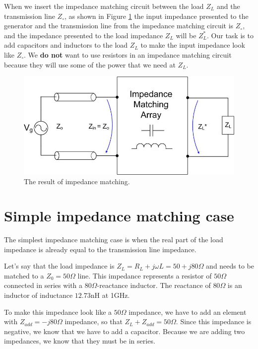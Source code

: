 \documentclass{ximera}
\begin{document}
  When we insert the impedance matching circuit between the load $Z_L$ and the transmission line $Z_\circ$, as shown in Figure  \ref{eq:impmatchgen1} the input impedance presented to the generator and the transmission line from the impedance matching circuit is $Z_\circ$, and the impedance presented to the load impedance $Z_L$ will be $Z_L^*$. Our task is to add capacitors and inductors to the load $Z_L$ to make the input impedance look like $Z_\circ$. We {\bf do not} want to use resistors in an impedance matching circuit because they will use some of the power that we need at $Z_L$.  

 

\begin{figure}[htbp]
\begin{center}
\includegraphics[scale=0.4]{../jpg/Impedancematching.jpg}
\end{center}
\caption{The result of impedance matching.}
\label{eq:impmatchgen1}
\end{figure}




\section{Simple impedance matching case}

The simplest impedance matching case is when the real part of the load impedance is already equal to the transmission line impedance. 

Let's say that the load impedance is $Z_L=R_L+j \omega L =50+j80 \Omega$ and needs to be matched to a $Z_0=50\Omega$ line. This impedance represents a resistor of $50\Omega$ connected in series with a $80 \Omega$-reactance inductor. The reactance of $80 \Omega$ is an inductor of inductance $12.73$nH at 1GHz.  

To make this impedance look like a $50 \Omega$ impedance, we have to add an element   with $Z_{add}=-j80 \Omega $ impedance, so that $Z_L+Z_{add}=50 \Omega$. Since this impedance is negative, we know that we have to add a capacitor. Because we are adding two impedances, we know that they must be in series. 
\end{document}
